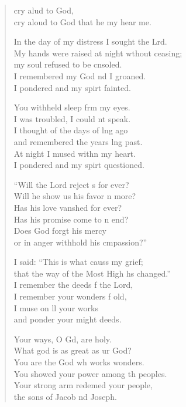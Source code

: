 \settowidth{\versewidth}{My hands were raised at night without ceasing; *}
\begin{verse}%
  \begin{patverse}
     cry alud to God,\Med\\
cry aloud to God that he my hear me.

In the day of my distress I sought the Lrd.\Flex\\
My hands were raised at night w\pointup{\i}thout ceasing;\Med\\
my soul refused to be cnsoled.\\
I remembered my God nd I groaned.\Med\\
I pondered and my spir\pointup{\i}t fainted.

You withheld sleep frm my eyes.\Med\\
I was troubled, I could nt speak.\\
I thought of the days of lng ago\Med\\
and remembered the years lng past.\\
At night I mused with\pointup{\i}n my heart.\Med\\
I pondered and my spir\pointup{\i}t questioned.

“Will the Lord reject s for ever?\Med\\
Will he show us his favor n more?\\
Has his love van\pointup{\i}shed for ever?\Med\\
Has his promise come to n end?\\
Does God forgt his mercy\Med\\
or in anger withhold his cmpassion?”

I said: “This is what causs my grief;\Med\\
that the way of the Most High hs changed.”\\
I remember the deeds f the Lord,\Med\\
I remember your wonders f old,\\
I muse on ll your works\Med\\
and ponder your might deeds.

Your ways, O Gd, are holy.\Med\\
What god is as great as ur God?\\
You are the God wh works wonders.\Med\\
You showed your power among th peoples.\\
Your strong arm redemed your people,\Med\\
the sons of Jacob nd Joseph.


\end{patverse}
\end{verse}
